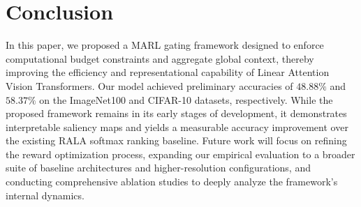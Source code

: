\section{Conclusion}
In this paper, we proposed a MARL gating framework designed to enforce computational budget constraints and aggregate global context, thereby improving the efficiency and representational capability of Linear Attention Vision Transformers. Our model achieved preliminary accuracies of $48.88\%$ and $58.37\%$ on the ImageNet100 and CIFAR-10 datasets, respectively. While the proposed framework remains in its early stages of development, it demonstrates interpretable saliency maps and yields a measurable accuracy improvement over the existing RALA\cite{fan2025breaking} softmax ranking baseline. Future work will focus on refining the reward optimization process, expanding our empirical evaluation to a broader suite of baseline architectures and higher-resolution configurations, and conducting comprehensive ablation studies to deeply analyze the framework's internal dynamics.



